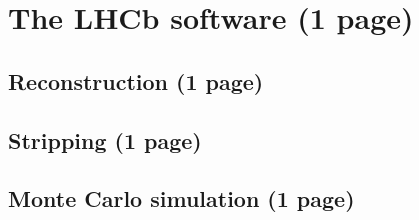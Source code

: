 
\section{The LHCb software (1 page)}
\label{sec:detector:software}

\subsection{Reconstruction (1 page)}
\label{sec:detector:software:reconstruction}

\subsection{Stripping (1 page)}
\label{sec:detector:software:stripping}

\subsection{Monte Carlo simulation (1 page)}
\label{sec:detector:software:simulation}